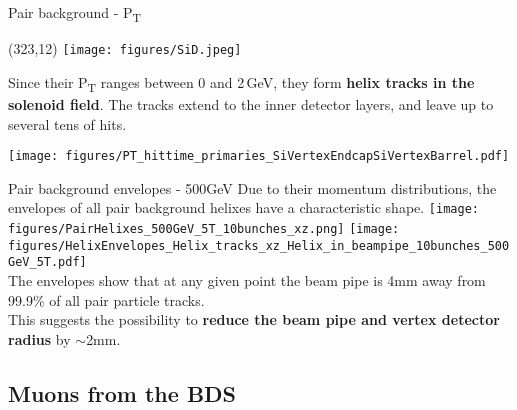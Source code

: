 \documentclass[xcolor={dvipsnames}]{beamer}
\newcommand{\sidlogo}{
  \setlength{\TPHorizModule}{1pt}
  \setlength{\TPVertModule}{1pt}
  \begin{textblock}{1}(323,12)
   \texttt{[image: figures/SiD.jpeg]}
  \end{textblock}
  }
\begin{document}
\begin{frame}{Pair background -  P\textsubscript{T}}
\sidlogo
Since their P\textsubscript{T} ranges between 0 and 2\,GeV, they form \textbf{helix tracks in the solenoid field}. The tracks extend to the inner detector layers, and leave up to several tens of hits.
\begin{center}
\texttt{[image: figures/PT\_hittime\_primaries\_SiVertexEndcapSiVertexBarrel.pdf]}
\end{center}
\end{frame}

\begin{frame}{Pair background envelopes - 500GeV}
Due to their momentum distributions, the envelopes of all pair background helixes have a characteristic shape.
   \texttt{[image: figures/PairHelixes\_500GeV\_5T\_10bunches\_xz.png]}\hspace*{0.1cm}
   \texttt{[image: figures/HelixEnvelopes\_Helix\_tracks\_xz\_Helix\_in\_beampipe\_10bunches\_500GeV\_5T.pdf]}\\
The envelopes show that at any given point the beam pipe is 4mm away from 99.9\% of all pair particle tracks.\\
This suggests the possibility to \textbf{reduce the beam pipe and vertex detector radius} by $\sim$2mm.
\end{frame}

\subsection{Muons from the BDS}
\end{document}
